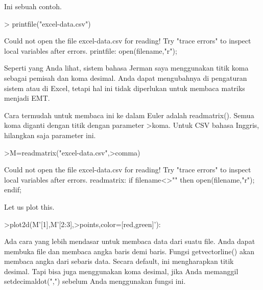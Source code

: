 \documentclass[a4paper,10pt]{article}
\begin{document}
\begin{eulernotebook}
\begin{eulercomment}
\begin{eulercomment}
\begin{eulercomment}
\begin{eulercomment}
\begin{eulercomment}
\begin{eulercomment}
\begin{eulercomment}
\begin{eulercomment}
\begin{eulercomment}
\begin{eulercomment}
\begin{eulercomment}
\begin{eulercomment}
\begin{eulercomment}
\begin{eulercomment}
\begin{eulercomment}
Ini sebuah contoh.
\end{eulercomment}
\begin{eulerprompt}
> printfile("excel-data.csv")
\end{eulerprompt}
\begin{euleroutput}
  Could not open the file
  excel-data.csv
  for reading!
  Try "trace errors" to inspect local variables after errors.
  printfile:
      open(filename,"r");
\end{euleroutput}
\begin{eulercomment}
Seperti yang Anda lihat, sistem bahasa Jerman saya menggunakan titik
koma sebagai pemisah dan koma desimal. Anda dapat mengubahnya di
pengaturan sistem atau di Excel, tetapi hal ini tidak diperlukan untuk
membaca matriks menjadi EMT.

Cara termudah untuk membaca ini ke dalam Euler adalah readmatrix().
Semua koma diganti dengan titik dengan parameter \textgreater{}koma. Untuk CSV
bahasa Inggris, hilangkan saja parameter ini.
\end{eulercomment}
\begin{eulerprompt}
>M=readmatrix("excel-data.csv",>comma)
\end{eulerprompt}
\begin{euleroutput}
  Could not open the file
  excel-data.csv
  for reading!
  Try "trace errors" to inspect local variables after errors.
  readmatrix:
      if filename<>"" then open(filename,"r"); endif;
\end{euleroutput}
\begin{eulercomment}
Let us plot this.
\end{eulercomment}
\begin{eulerprompt}
>plot2d(M'[1],M'[2:3],>points,color=[red,green]'):
\end{eulerprompt}
\begin{eulercomment}
Ada cara yang lebih mendasar untuk membaca data dari suatu file. Anda
dapat membuka file dan membaca angka baris demi baris. Fungsi
getvectorline() akan membaca angka dari sebaris data. Secara default,
ini mengharapkan titik desimal. Tapi bisa juga menggunakan koma
desimal, jika Anda memanggil setdecimaldot(",") sebelum Anda
menggunakan fungsi ini.


\end{eulercomment}
\end{eulercomment}
\end{eulercomment}
\end{eulercomment}
\end{eulercomment}
\end{eulercomment}
\end{eulercomment}
\end{eulercomment}
\end{eulercomment}
\end{eulercomment}
\end{eulercomment}
\end{eulercomment}
\end{eulercomment}
\end{eulercomment}
\end{eulercomment}
\end{eulernotebook}
\end{document}
